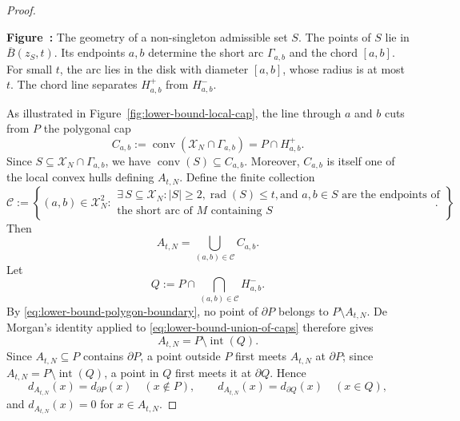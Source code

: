 \documentclass{article}
\numberwithin{equation}{section}
\begin{document}
\begin{proof}
\begin{center}
\par\smallskip
\begin{minipage}{0.88\linewidth}
\small
\textbf{Figure~\thefigure:}
The geometry of a non-singleton admissible set $S$. The points of $S$ lie
in $\overline B(z_S,t)$. Its endpoints $a,b$ determine the short arc
$\Gamma_{a,b}$ and the chord $[a,b]$. For small $t$, the arc lies in the
disk with diameter $[a,b]$, whose radius is at most $t$. The chord line
separates $H_{a,b}^+$ from $H_{a,b}^-$.
\end{minipage}
\end{center}
\endgroup


As illustrated in Figure~\ref{fig:lower-bound-local-cap}, the line through
$a$ and $b$ cuts from $P$ the polygonal cap
\[
 C_{a,b}:=\operatorname{conv}(\mathcal X_N\cap\Gamma_{a,b})
          =P\cap H_{a,b}^+.
\]
Since $S\subseteq\mathcal X_N\cap\Gamma_{a,b}$, we have
$\operatorname{conv}(S)\subseteq C_{a,b}$.
Moreover, $C_{a,b}$ is itself one of the local convex hulls defining
$A_{t,N}$. Define the finite collection
\[
 \mathcal C:=\left\{(a,b)\in\mathcal X_N^2:
 \begin{array}{l}
 \exists \, S\subseteq\mathcal X_N : |S|\ge2, \operatorname{rad}(S)\le t,
 \text{and }a,b\in S\text{ are the endpoints of}\\ \text{the short arc of }M
 \text{ containing }S
 \end{array}\right\}.
\]
Then
\begin{equation}
 A_{t,N}=\bigcup_{(a,b)\in\mathcal C}C_{a,b}.
\label{eq:lower-bound-union-of-caps}
\end{equation}
Let
\[
 Q:=P\cap\bigcap_{(a,b)\in\mathcal C}H_{a,b}^-.
\]
By \eqref{eq:lower-bound-polygon-boundary}, no point of
$\partial P$ belongs to $P\setminus A_{t,N}$. De Morgan's identity applied
to \eqref{eq:lower-bound-union-of-caps} therefore gives
\begin{equation}
 A_{t,N}=P\setminus\operatorname{int}(Q).
\label{eq:lower-bound-cap-decomposition}
\end{equation}
Since $A_{t,N}\subseteq P$ contains $\partial P$, a point outside $P$
first meets $A_{t,N}$ at $\partial P$; since
$A_{t,N}=P\setminus\operatorname{int}(Q)$, a point in $Q$ first meets it
at $\partial Q$. Hence
\[
 d_{A_{t,N}}(x)=d_{\partial P}(x)\quad(x\notin P),
 \qquad
 d_{A_{t,N}}(x)=d_{\partial Q}(x)\quad(x\in Q),
\]
and $d_{A_{t,N}}(x)=0$ for $x\in A_{t,N}$.


\end{proof}
\end{document}
